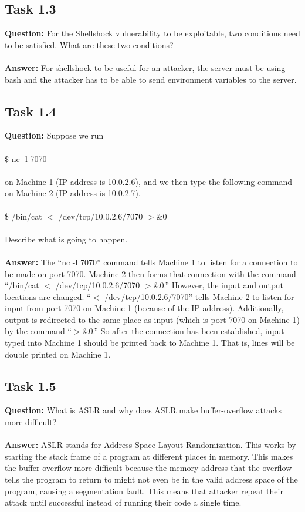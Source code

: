 \documentclass[11pt]{article}
\begin{document}
\subsection*{Task 1.3}

\textbf{Question: } For the Shellshock vulnerability to be exploitable, two conditions need to be satisfied. What are these two conditions? \\\\
\textbf{Answer: } For shellshock to be useful for an attacker, the server must be using bash and the attacker has to be able to send environment variables to the server.

\subsection*{Task 1.4}

\textbf{Question: } Suppose we run \\\\
\indent \$ nc -l 7070 \\\\
on Machine 1 (IP address is 10.0.2.6), and we then type the following command on Machine 2 (IP address is 10.0.2.7). \\\\
\indent \$ /bin/cat $<$ /dev/tcp/10.0.2.6/7070 $>$\&0 \\\\
Describe what is going to happen. \\\\
\textbf{Answer: } The ``nc -l 7070'' command tells Machine 1 to listen for a connection to be made on port 7070. Machine 2 then forms that connection with the command ``/bin/cat $<$ /dev/tcp/10.0.2.6/7070 $>$\&0.'' However, the input and output locations are changed. ``$<$ /dev/tcp/10.0.2.6/7070'' tells Machine 2 to listen for input from port 7070 on Machine 1 (because of the IP address). Additionally, output is redirected to the same place as input (which is port 7070 on Machine 1) by the command ``$>$\&0.'' So after the connection has been established, input typed into Machine 1 should be printed back to Machine 1. That is, lines will be double printed on Machine 1.

\subsection*{Task 1.5}

\textbf{Question: } What is ASLR and why does ASLR make buffer-overflow attacks more difficult? \\\\
\textbf{Answer: } ASLR stands for Address Space Layout Randomization. This works by starting the stack frame of a program at different places in memory. This makes the buffer-overflow more difficult because the memory address that the overflow tells the program to return to might not even be in the valid address space of the program, causing a segmentation fault. This means that attacker repeat their attack until successful instead of running their code a single time.
\end{document}
